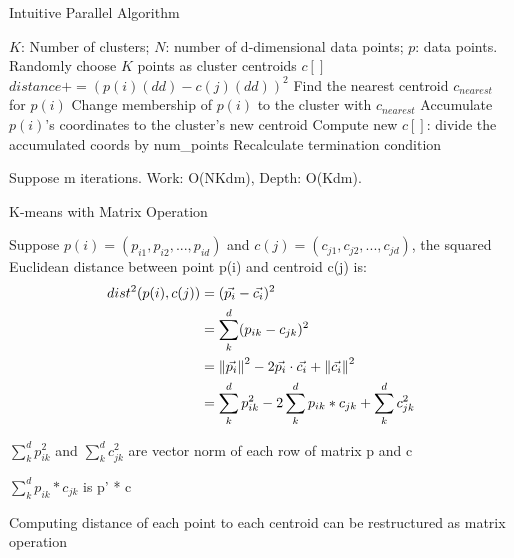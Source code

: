 \documentclass[
nopagebreaks,
style=klope,
fleqn]{powerdot}
\begin{document}
\begin{slide} {Intuitive Parallel Algorithm}
  \footnotesize
  \begin{algorithmic}[1]
    \INPUT $K$: Number of clusters; $N$: number of d-dimensional data points; $p$: data points.
     \label{alg:p}
    \State Randomly choose $K$ points as cluster centroids $c[]$
    \State $distance += (p(i)(dd) - c(j)(dd))^2$
    \EndFor
    \EndFor
    \State Find the nearest centroid $c_{nearest}$ for $p(i)$
    \State Change membership of $p(i)$ to the cluster with $c_{nearest}$
    \State Accumulate $p(i)$'s coordinates to the cluster's new centroid
    \EndParFor
    \State Compute new $c[]$: divide the accumulated coords by num\_points
    \State Recalculate termination condition
    \EndWhile
    \EndFunction  
  \end{algorithmic}
  \begin{compactitem}
    \vspace{5mm}
  \item{Suppose m iterations. 
    Work: O(NKdm), Depth: O(Kdm).}
  \end{compactitem}
\end{slide}

\begin{slide}{K-means with Matrix Operation}
  \footnotesize
  \begin{compactitem}
  \item{Suppose $p(i) = (p_{i1}, p_{i2}, ..., p_{id})$ and $c(j) = (c_{j1},
    c_{j2}, ..., c_{jd})$, the squared Euclidean distance between point p(i) and centroid c(j) is: 
    \begin{align}
      dist^2(p(i),c(j)) &= (\vec{p_i} - \vec{c_i})^2 \\
                 &= \sum\limits_{k}^d (p_{ik} - c_{jk})^2  \label{e1}\\
             &= \left\lVert\vec{p_i}\right\rVert^2 - 2 \vec{p_i} \cdot \vec{c_i} + \left\lVert\vec{c_i}\right\rVert^2  \nonumber\\
             &= \sum\limits_{k}^d p_{ik}^2 - 2 \sum\limits_{k}^d p_{ik}*c_{jk} + \sum\limits_{k}^d c_{jk}^2 \label{e2}
  \end{align}}
  \item{
    $\sum\limits_{k}^d p_{ik}^2$ and $\sum\limits_{k}^d c_{jk}^2$ are vector norm of each row of matrix p and c
  }
  \item{
    $\sum\limits_{k}^d p_{ik}*c_{jk}$ is p' * c
  }
  \item{Computing distance of each point to each centroid can be restructured as matrix operation}
  \end{compactitem}
\end{slide}
\end{document}
